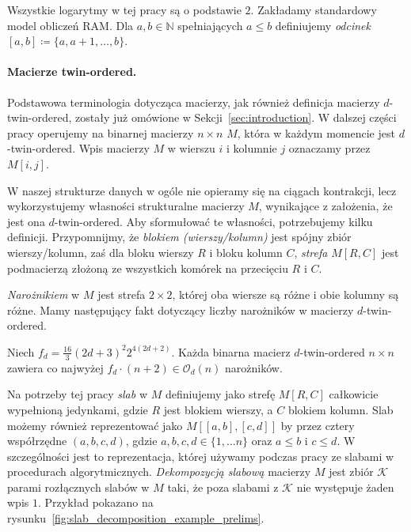 \documentclass[runningheads]{llncs}
\newcommand{\Oh}{\mathcal{O}}
\renewcommand{\leq}{\leqslant}
\begin{document}
Wszystkie logarytmy w tej pracy są o podstawie $2$. Zakładamy standardowy model obliczeń RAM. Dla $a,b\in \mathbb{N}$ spełniających $a\leq b$ definiujemy {\em{odcinek}} $[a,b]\coloneqq \{a,a+1,\ldots,b\}$.

\paragraph*{Macierze twin-ordered.}
Podstawowa terminologia dotycząca macierzy, jak również definicja
macierzy $d$-twin-ordered, zostały już omówione w
Sekcji~\ref{sec:introduction}.
W dalszej części pracy operujemy na binarnej macierzy $n\times n$ $M$,
która w każdym momencie jest $d$-twin-ordered. Wpis macierzy $M$ w wierszu $i$ i kolumnie $j$ oznaczamy przez $M[i,j]$.




W naszej strukturze danych w ogóle nie opieramy się na ciągach kontrakcji,
lecz wykorzystujemy własności strukturalne macierzy $M$, wynikające z
założenia, że jest ona $d$-twin-ordered. Aby sformułować te własności,
potrzebujemy kilku definicji. Przypomnijmy, że {\em{blokiem (wierszy/kolumn)}} jest
spójny zbiór wierszy/kolumn, zaś dla bloku wierszy $R$ i bloku
kolumn $C$, {\em{strefa}} $M[R,C]$ jest podmacierzą złożoną ze wszystkich
komórek na przecięciu $R$ i $C$.

{\em{Narożnikiem}} w $M$ jest strefa $2\times 2$, której oba wiersze są różne i obie kolumny są różne. Mamy następujący fakt dotyczący liczby narożników w macierzy $d$-twin-ordered.

\begin{lemma}\label{lem:mixzones}
	Niech $f_d=\frac{16}
{3}(2d + 3)^2 2^{4(2d+2)}$. Każda binarna macierz $d$-twin-ordered $n \times n$
	zawiera co najwyżej $f_d \cdot (n+2) \in \Oh_d(n)$ narożników.
\end{lemma}


Na potrzeby tej pracy \emph{slab} w
$M$ definiujemy jako strefę $M[R,C]$ całkowicie wypełnioną jedynkami, gdzie $R$ jest blokiem wierszy, a $C$ blokiem kolumn. Slab możemy również reprezentować jako
$M[[a,b],[c,d]]$ by
przez
cztery współrzędne $(a,b,c,d)$, gdzie
$a,b,c,d \in \{ 1, \ldots n \}$ oraz $a\leq b$ i $c\leq d$. W szczególności jest to reprezentacja, której używamy podczas pracy ze slabami w procedurach algorytmicznych.
{\em{Dekompozycją slabową}} macierzy $M$
jest zbiór $\mathcal{K}$ parami rozłącznych slabów w $M$
taki, że poza slabami z $\mathcal{K}$ nie występuje żaden
wpis $1$. Przykład pokazano na rysunku~\ref{fig:slab_decomposition_example_prelims}.
\end{document}
